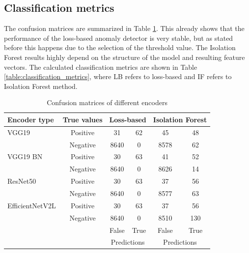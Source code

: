 \subsection{Classification metrics}
The confusion matrices are summarized in Table \ref{table:confusion_matrices}.
This already shows that the performance of the loss-based anomaly detector is very stable,
but as stated before this happens due to the selection of the threshold value.
The Isolation Forest results highly depend on the structure of the model and resulting feature vectors.
The calculated classification metrics are shown in Table \ref{table:classification_metrics},
where LB refers to loss-based and IF refers to Isolation Forest method.

\begin{table}[H]
    \centering
    \begin{tabular}{l c |c c| c c}
        Encoder type    & True values & \multicolumn{2}{c|}{Loss-based}  & \multicolumn{2}{c}{Isolation Forest}                \\
        \hline
        VGG19           & Positive    & 31                               & 62                                   & 45    & 48   \\
                        & Negative    & 8640                             & 0                                    & 8578  & 62   \\
        \hline
        VGG19 BN        & Positive    & 30                               & 63                                   & 41    & 52   \\
                        & Negative    & 8640                             & 0                                    & 8626  & 14   \\
        \hline
        ResNet50        & Positive    & 30                               & 63                                   & 37    & 56   \\
                        & Negative    & 8640                             & 0                                    & 8577  & 63   \\
        \hline
        EfficientNetV2L & Positive    & 30                               & 63                                   & 37    & 56   \\
                        & Negative    & 8640                             & 0                                    & 8510  & 130  \\
        \hline
                        &             & False                            & True                                 & False & True \\
                        &             & \multicolumn{2}{c|}{Predictions} & \multicolumn{2}{c}{Predictions}                     \\
    \end{tabular}
    \caption{Confusion matrices of different encoders}
    \label{table:confusion_matrices}
\end{table}

